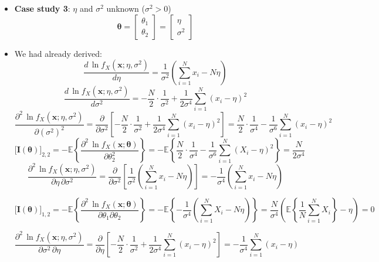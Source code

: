 \begin{itemize}
    \item \textbf{Case study 3}: \(\eta\) and \(\sigma^2\) unknown (\(\sigma^2>0\))
    \[\mathbf{\theta}=
    \begin{bmatrix}
        \theta_1\\\theta_2
    \end{bmatrix}=\begin{bmatrix}
        \eta\\\sigma^2
    \end{bmatrix}
    \]
    \item We had already derived:
    $$
    \frac{d\,\ln f_{X}(\mathbf{x};\eta,\sigma^{2})}{d\eta}
    =\frac{1}{\sigma^{2}}\!\left(\sum_{i=1}^{N}x_{i}-N\eta\right)
    $$ 
    $$
    \frac{d\,\ln f_{X}(\mathbf{x};\eta,\sigma^{2})}{d\sigma^{2}}
    =-\frac{N}{2}\cdot\frac{1}{\sigma^{2}}
    +\frac{1}{2\sigma^{4}}\sum_{i=1}^{N}(x_{i}-\eta)^{2}
    $$
    $$
    \frac{\partial^{2}\,\ln f_{X}(\mathbf{x};\eta,\sigma^{2})}{\partial(\sigma^{2})^{2}}
    =\frac{\partial}{\partial \sigma^{2}}
    \!\left[-\frac{N}{2}\cdot\frac{1}{\sigma^{2}}
    +\frac{1}{2\sigma^{4}}\sum_{i=1}^{N}(x_{i}-\eta)^{2}\right]
    =\frac{N}{2}\cdot\frac{1}{\sigma^{4}}
    -\frac{1}{\sigma^{6}}\sum_{i=1}^{N}(x_{i}-\eta)^{2}
    $$  
    $$
    \big[\mathbf{I}(\boldsymbol{\theta})\big]_{2,2}
    =-\mathbb{E}\!\left\{\frac{\partial^{2}\,\ln f_{X}(\mathbf{x};\boldsymbol{\theta})} {\partial \theta_{2}^{2}}\right\}
    =-\mathbb{E}\!\left\{\frac{N}{2}\cdot\frac{1}{\sigma^{4}}
    -\frac{1}{\sigma^{6}}\sum_{i=1}^{N}(X_{i}-\eta)^{2}\right\}
    =\frac{N}{2\sigma^{4}}
    $$
    $$
\frac{\partial^{2}\,\ln f_{X}(\mathbf{x};\eta,\sigma^{2})}{\partial \eta\,\partial \sigma^{2}}
=\frac{\partial}{\partial \sigma^{2}}
\!\left[\frac{1}{\sigma^{2}}\!\left(\sum_{i=1}^{N}x_{i}-N\eta\right)\right]
=-\frac{1}{\sigma^{4}}\!\left(\sum_{i=1}^{N}x_{i}-N\eta\right)
$$ 

$$
\big[\mathbf{I}(\boldsymbol{\theta})\big]_{1,2}
=-\mathbb{E}\!\left\{\frac{\partial^{2}\,\ln f_{X}(\mathbf{x};\boldsymbol{\theta})}{\partial \theta_{1}\partial \theta_{2}}\right\}
=-\mathbb{E}\!\left\{-\frac{1}{\sigma^{4}}\!\left(\sum_{i=1}^{N}X_{i}-N\eta\right)\right\}
=\frac{N}{\sigma^{4}}\!\left(\mathbb{E}\!\left\{\frac{1}{N}\sum_{i=1}^{N}X_{i}\right\}-\eta\right)=0
$$ 

$$
\frac{\partial^{2}\,\ln f_{X}(\mathbf{x};\eta,\sigma^{2})}{\partial \sigma^{2}\,\partial \eta}
=\frac{\partial}{\partial \eta}
\!\left[-\frac{N}{2}\cdot\frac{1}{\sigma^{2}}
+\frac{1}{2\sigma^{4}}\sum_{i=1}^{N}(x_{i}-\eta)^{2}\right]
=-\frac{1}{\sigma^{4}}\sum_{i=1}^{N}(x_{i}-\eta)
$$ 


\end{itemize}
